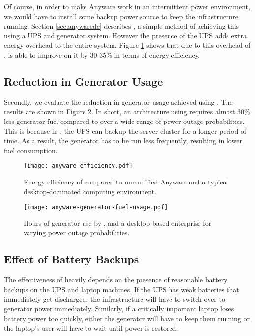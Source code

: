 Of course, in order to make Anyware work in an intermittent power environment, 
we would have to install some backup power source to keep the infrastructure
running. Section \ref{sec:anywaredc} describes \anywareups{}, 
a simple method of achieving this using a UPS and generator system. However
the presence of the UPS adds extra energy overhead to the entire system. Figure
\ref{fig:anyware-efficiency} shows that due to this overhead of \anywareups{}, 
\anywaredc{} is able to improve on it by 30-35\% in terms of energy efficiency.

\subsection{Reduction in Generator Usage}
\label{sec:generator_fuel_savings}

Secondly, we evaluate the reduction in generator usage achieved using
\anywaredc{}. The results are shown in Figure \ref{fig:anyware-generator-fuel-usage}.
In short, an architecture using \anywaredc{} requires almost 30\%
less generator fuel compared to \anywareups{} over a wide range of
power outage probabilities. This is 
because in \anywaredc{}, the UPS can backup the server cluster for a longer period of time. As a
result, the generator has to be run less frequently, resulting in
lower fuel consumption.

\begin{figure}[h!]
\centering
\texttt{[image: anyware-efficiency.pdf]}
\caption{Energy efficiency of \anywaredc{} compared to unmodified Anyware and a typical
desktop-dominated computing environment.}
\label{fig:anyware-efficiency}
\end{figure}



\begin{figure}[h!]
\centering
\texttt{[image: anyware-generator-fuel-usage.pdf]}
\caption{Hours of generator use by \anywaredc{}, \anywareups{} and
a desktop-based enterprise for varying power outage probabilities.}
\label{fig:anyware-generator-fuel-usage}
\end{figure}



\subsection{Effect of Battery Backups}
\label{sec:laptop_battery_effect}

The effectiveness of \anywaredc{} heavily depends on the presence of 
reasonable battery backups on the UPS and laptop machines. If the UPS has weak
batteries that immediately get discharged, the infrastructure will have to switch
over to generator power immediately. Similarly, if a critically important laptop
loses battery power too quickly, either the generator will have to keep them running
or the laptop's user will have to wait until power is restored.

